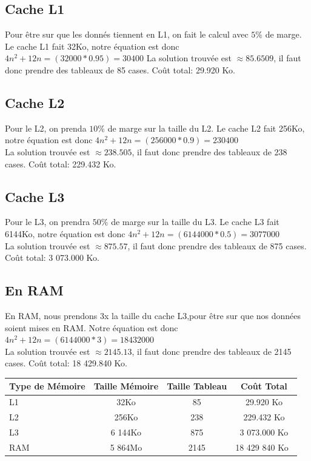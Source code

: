 \documentclass[a4paper]{report}
\begin{document}
\subsection*{Cache L1}
Pour être sur que les donnés tiennent en L1, on fait le calcul avec $5\%$ de marge.
Le cache L1 fait 32Ko, notre équation est donc $4n^2+12n=(32 000*0.95)=30 400$
La solution trouvée est $\approx 85.6509$, il faut donc prendre des tableaux de 85 cases. Coût total: 29.920 Ko.\\

\subsection*{Cache L2}
Pour le L2, on prenda $10\%$ de marge sur la taille du L2.
Le cache L2 fait 256Ko, notre équation est donc $4n^2+12n=(256 000*0.9)=230 400$\\
La solution trouvée est $\approx 238.505$, il faut donc prendre des tableaux de 238 cases. Coût total: 229.432 Ko.\\

\subsection*{Cache L3}
Pour le L3, on prendra $50\%$ de marge sur la taille du L3.
Le cache L3 fait 6144Ko, notre équation est donc $4n^2+12n=(6 144 000*0.5)= 3 077 000$\\
La solution trouvée est $\approx 875.57$, il faut donc prendre des tableaux de 875 cases. Coût total: 3 073.000 Ko.\\

\subsection*{En RAM}
En RAM, nous prendons 3x la taille du cache L3,pour être sur que nos données soient mises en RAM.
Notre équation est donc $4n^2+12n=(6 144 000*3)=18 432 000$\\
La solution trouvée est $\approx 2145.13$, il faut donc prendre des tableaux de 2145 cases. Coût total: 18 429.840 Ko.\\

\begin{tabular}{ l c | c c }
    Type de Mémoire & Taille Mémoire & Taille Tableau & Coût Total\\\hline
    L1 & 32Ko & 85 & 29.920 Ko\\ 
    L2 & 256Ko & 238 & 229.432 Ko \\
    L3 & 6 144Ko & 875 & 3 073.000 Ko \\
    RAM & 5 864Mo & 2145 & 18 429 840 Ko \\
\end{tabular}
\end{document}

